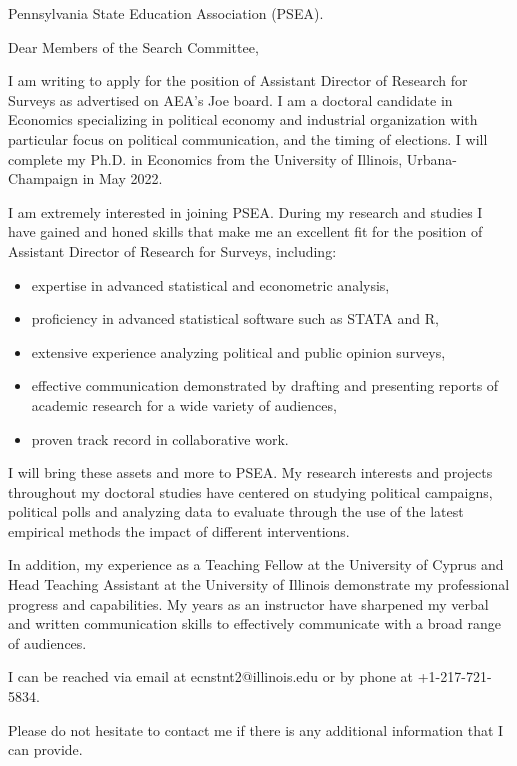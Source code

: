 \documentclass[12pt]{letter}
\begin{document}
\date{}
\begin{letter}{Pennsylvania State Education Association (PSEA).}

\opening{Dear Members of the Search Committee,}

I am writing to apply for the position of Assistant Director of Research for Surveys as advertised on AEA's Joe board.
I am a doctoral candidate in Economics specializing in political economy and industrial organization with particular focus on political communication, and the timing of elections.
I will complete my Ph.D. in Economics from the University of Illinois, Urbana-Champaign in May 2022. 

I am extremely interested in joining PSEA.
During my research and studies I have gained and honed skills that make me an excellent fit for the position of Assistant Director of Research for Surveys, including:

\begin{itemize}
    \item expertise in advanced statistical and econometric analysis,
    \item proficiency in advanced statistical software such as STATA and R,
    \item extensive experience analyzing political and public opinion surveys,
    \item effective communication demonstrated by drafting and presenting reports of academic research for a wide variety of audiences,
    \item proven track record in collaborative work.
\end{itemize}

I will bring these assets and more to PSEA.
My research interests and projects throughout my doctoral studies have centered on studying political campaigns, political polls and analyzing data to evaluate through the use of the latest empirical methods the impact of different interventions.

In addition, my experience as a Teaching Fellow at the University of Cyprus and Head Teaching Assistant at the University of Illinois demonstrate my professional progress and capabilities.
My years as an instructor have sharpened my verbal and written communication skills to effectively communicate with a broad range of audiences.


I can be reached via email at ecnstnt2@illinois.edu or by phone at +1-217-721-5834.

Please do not hesitate to contact me if there is any additional information that I can provide.


\end{letter}
\end{document}
